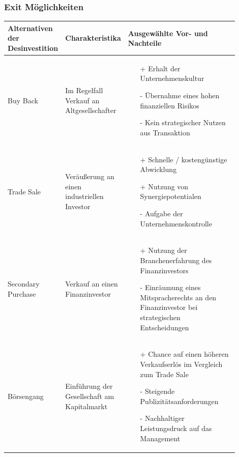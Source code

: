 \subsubsection{Exit Möglichkeiten}
\begin{tabular}{|p{0.15\linewidth}|p{0.25\linewidth}|p{0.5\linewidth}|}
	\hline 
	\textbf{Alternativen der Desinvestition} & \textbf{Charakteristika} & \textbf{Ausgewählte Vor- und Nachteile} \\ \hline
	Buy Back & Im Regelfall Verkauf	an Altgesellschafter & \begin{itemize} 
																\item[+] Erhalt der Unternehmenskultur
																\item[-] Übernahme eines hohen finanziellen Risikos
																\item[-] Kein strategischer Nutzen aus Transaktion
															\end{itemize} \\ \hline
	Trade Sale & Veräußerung an	einen industriellen	Investor & \begin{itemize} 
																	\item[+] Schnelle / kostengünstige Abwicklung
																	\item[+] Nutzung von Synergiepotentialen
																	\item[-] Aufgabe der Unternehmenskontrolle
																\end{itemize} \\ \hline
	Secondary Purchase & Verkauf an einen Finanzinvestor & \begin{itemize} 
																\item[+] Nutzung der Branchenerfahrung des Finanzinvestors
																\item[-] Einräumung eines Mitspracherechts an den Finanzinvestor bei strategischen Entscheidungen
															\end{itemize} \\ \hline
	Börsengang & Einführung der Gesellschaft am Kapitalmarkt & \begin{itemize} 
																	\item[+] Chance auf einen höheren Verkaufserlös im Vergleich zum Trade Sale
																	\item[-] Steigende Publizitätsanforderungen
																	\item[-] Nachhaltiger Leistungsdruck auf das Management
																\end{itemize} \\ \hline
\end{tabular} 

